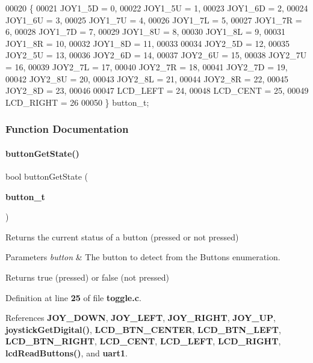 \begin{DoxyCode}
00020              \{
00021     JOY1_5D = 0,
00022     JOY1_5U = 1,
00023     JOY1_6D = 2,
00024     JOY1_6U = 3,
00025     JOY1_7U = 4,
00026     JOY1_7L = 5,
00027     JOY1_7R = 6,
00028     JOY1_7D = 7,
00029     JOY1_8U = 8,
00030     JOY1_8L = 9,
00031     JOY1_8R = 10,
00032     JOY1_8D = 11,
00033 
00034     JOY2_5D = 12,
00035     JOY2_5U = 13,
00036     JOY2_6D = 14,
00037     JOY2_6U = 15,
00038     JOY2_7U = 16,
00039     JOY2_7L = 17,
00040     JOY2_7R = 18,
00041     JOY2_7D = 19,
00042     JOY2_8U = 20,
00043     JOY2_8L = 21,
00044     JOY2_8R = 22,
00045     JOY2_8D = 23,
00046 
00047     LCD_LEFT = 24,
00048     LCD_CENT = 25,
00049     LCD_RIGHT = 26
00050 \} button_t;
\end{DoxyCode}


\subsubsection{Function Documentation}
\mbox{\label{toggle_8h_a72989c21af9d14672f6e59c44a2b59bc}} 
\paragraph{button\+Get\+State()}
{\footnotesize\ttfamily bool button\+Get\+State (\begin{DoxyParamCaption}\item[{\textbf{ button\+\_\+t}}]{ }\end{DoxyParamCaption})}



Returns the current status of a button (pressed or not pressed) 


\begin{DoxyParams}{Parameters}
{\em button} & The button to detect from the Buttons enumeration.\\
\hline
\end{DoxyParams}
\begin{DoxyReturn}{Returns}
true (pressed) or false (not pressed) 
\end{DoxyReturn}


Definition at line \textbf{ 25} of file \textbf{ toggle.\+c}.



References \textbf{ J\+O\+Y\+\_\+\+D\+O\+WN}, \textbf{ J\+O\+Y\+\_\+\+L\+E\+FT}, \textbf{ J\+O\+Y\+\_\+\+R\+I\+G\+HT}, \textbf{ J\+O\+Y\+\_\+\+UP}, \textbf{ joystick\+Get\+Digital()}, \textbf{ L\+C\+D\+\_\+\+B\+T\+N\+\_\+\+C\+E\+N\+T\+ER}, \textbf{ L\+C\+D\+\_\+\+B\+T\+N\+\_\+\+L\+E\+FT}, \textbf{ L\+C\+D\+\_\+\+B\+T\+N\+\_\+\+R\+I\+G\+HT}, \textbf{ L\+C\+D\+\_\+\+C\+E\+NT}, \textbf{ L\+C\+D\+\_\+\+L\+E\+FT}, \textbf{ L\+C\+D\+\_\+\+R\+I\+G\+HT}, \textbf{ lcd\+Read\+Buttons()}, and \textbf{ uart1}.



